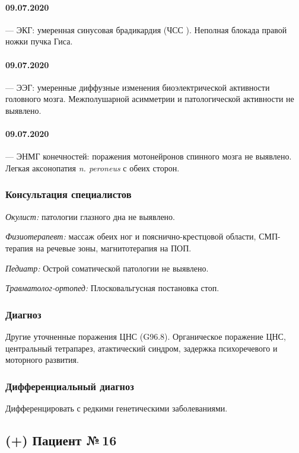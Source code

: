 \documentclass[a4paper,14pt]{extarticle}
\newcommand{\bpm}{уд/мин}
\begin{document}
\paragraph{09.07.2020} --- ЭКГ: умеренная синусовая брадикардия (ЧСС \numprint[\bpm]{85--93}). Неполная блокада правой ножки пучка Гиса.
\paragraph{09.07.2020} --- ЭЭГ: умеренные диффузные изменения биоэлектрической активности головного мозга. Межполушарной асимметрии и патологической активности не выявлено.
\paragraph{09.07.2020} --- ЭНМГ конечностей: поражения мотонейронов спинного мозга не выявлено. Легкая аксонопатия \textit{n. peroneus} с обеих сторон.

\subsubsection*{Консультация специалистов}

\emph{Окулист:} патологии глазного дна не выявлено.

\emph{Физиотерапевт:} массаж обеих ног и пояснично-крестцовой области, СМП-терапия на речевые зоны, магнитотерапия на ПОП.

\emph{Педиатр:} Острой соматической патологии не выявлено.

\emph{Травматолог-ортопед:} Плосковальгусная постановка стоп.

\subsubsection*{Диагноз}

Другие уточненные поражения ЦНС (G96.8). Органическое поражение ЦНС, центральный тетрапарез, атактический синдром, задержка психоречевого и моторного развития.

\subsubsection*{Дифференциальный диагноз}

Дифференцировать с редкими генетическими заболеваниями.

\newpage
\subsection*{(+) Пациент №\,16}
\end{document}
